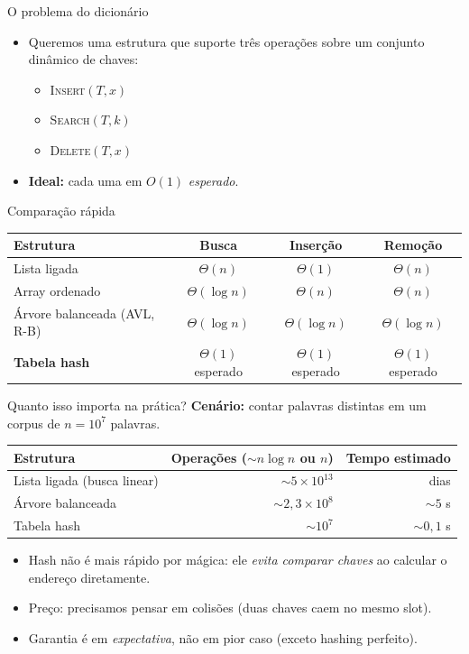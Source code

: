 \documentclass[aspectratio=169]{beamer}
\begin{document}
\begin{frame}[shrink=10]{O problema do dicionário}
\begin{itemize}
\item Queremos uma estrutura que suporte três operações sobre um conjunto dinâmico de chaves:
\begin{itemize}
  \item \textsc{Insert}$(T, x)$
  \item \textsc{Search}$(T, k)$
  \item \textsc{Delete}$(T, x)$
\end{itemize}
\item \textbf{Ideal:} cada uma em $O(1)$ \emph{esperado}.
\end{itemize}
\begin{block}{Comparação rápida}
\centering
\begin{tabular}{lccc}
\toprule
Estrutura & Busca & Inserção & Remoção \\
\midrule
Lista ligada & $\Theta(n)$ & $\Theta(1)$ & $\Theta(n)$ \\
Array ordenado & $\Theta(\log n)$ & $\Theta(n)$ & $\Theta(n)$ \\
Árvore balanceada (AVL, R-B) & $\Theta(\log n)$ & $\Theta(\log n)$ & $\Theta(\log n)$ \\
\textbf{Tabela hash} & $\Theta(1)$ esperado & $\Theta(1)$ esperado & $\Theta(1)$ esperado \\
\bottomrule
\end{tabular}
\end{block}
\end{frame}

\begin{frame}[shrink=10]{Quanto isso importa na prática?}
\textbf{Cenário:} contar palavras distintas em um corpus de $n = 10^7$ palavras.
\centering
\begin{tabular}{lrr}
\toprule
Estrutura & Operações ($\sim n \log n$ ou $n$) & Tempo estimado \\
\midrule
Lista ligada (busca linear) & $\sim 5 \times 10^{13}$ & dias \\
Árvore balanceada & $\sim 2{,}3 \times 10^8$ & $\sim 5$ s \\
Tabela hash & $\sim 10^7$ & $\sim 0{,}1$ s \\
\bottomrule
\end{tabular}

\vspace{0.4cm}
\begin{itemize}
\item Hash não é mais rápido por mágica: ele \emph{evita comparar chaves} ao calcular o endereço diretamente.
\item Preço: precisamos pensar em \alert{colisões} (duas chaves caem no mesmo slot).
\item Garantia é em \emph{expectativa}, não em pior caso (exceto hashing perfeito).
\end{itemize}
\end{frame}
\end{document}

